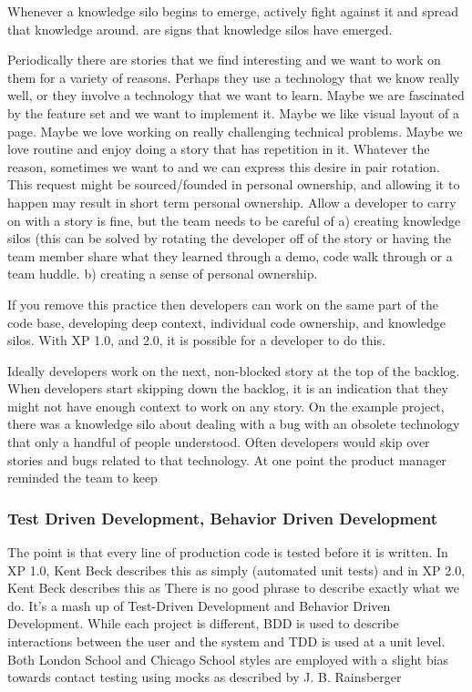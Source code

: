 Whenever a knowledge silo begins to emerge, actively fight against it and spread that knowledge around.  are signs that knowledge silos have emerged. 

Periodically there are stories that we find interesting and we want to work on them for a variety of reasons. Perhaps they use a technology that we know really well, or they involve a technology that we want to learn. Maybe we are fascinated by the feature set and we want to implement it. Maybe we like visual layout of a page. Maybe we love working on really challenging technical problems. Maybe we love routine and enjoy doing a story that has repetition in it. Whatever the reason, sometimes we want to  and we can express this desire in pair rotation. This request might be sourced/founded in personal ownership, and allowing it to happen may result in short term personal ownership. Allow a developer to carry on with a story is fine, but the team needs to be careful of a) creating knowledge silos (this can be solved by rotating the developer off of the story or having the team member share what they learned through a demo, code walk through or a team huddle. b) creating a sense of personal ownership.

If you remove this practice then developers can work on the same part of the code base, developing deep context, individual code ownership, and knowledge silos. With XP 1.0, and 2.0, it is possible for a developer to do this. 

Ideally developers work on the next, non-blocked story at the top of the backlog. When developers start skipping down the backlog, it is an indication that they might not have enough context to work on any story. On the example project, there was a knowledge silo about dealing with a bug with an obsolete technology that only a handful of people understood. Often developers would skip over stories and bugs related to that technology. At one point the product manager reminded the team to keep  


\subsubsection{Test Driven Development, Behavior Driven Development}
The point is that every line of production code is tested before it is written.
In XP 1.0, Kent Beck describes this as simply  (automated unit tests) and in XP 2.0, Kent Beck describes this as  There is no good phrase to describe exactly what we do. It's a mash up of Test-Driven Development and Behavior Driven Development. While each project is different, BDD is used to describe interactions between the user and the system and TDD is used at a unit level. Both London School and Chicago School styles are employed with a slight bias towards contact testing using mocks as described by J. B. Rainsberger \cite{RainsbergerIntegrationTestsYouTube}

